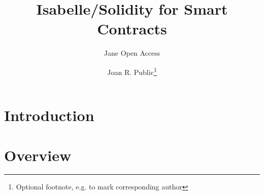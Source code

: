 \documentclass[a4paper,UKenglish,cleveref, autoref, thm-restate]{oasics-v2021}
\title{Isabelle/Solidity for Smart Contracts} %
\author{Jane {Open Access}}{Dummy University Computing Laboratory, [optional: Address], Country \and My second affiliation, Country \and \url{http://www.myhomepage.edu} }{johnqpublic@dummyuni.org}{https://orcid.org/0000-0002-1825-0097}{(Optional) author-specific funding acknowledgements}%
\author{Joan R. Public\footnote{Optional footnote, e.g. to mark corresponding author}}{Department of Informatics, Dummy College, [optional: Address], Country}{joanrpublic@dummycollege.org}{[orcid]}{[funding]}
\begin{document}
\maketitle

\begin{abstract}

\end{abstract}

\section{Introduction}
\label{sec-intro}

\section{Overview}
\end{document}
